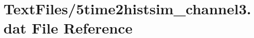 \hypertarget{5time2histsim__channel3_8dat}{}\section{Text\+Files/5time2histsim\+\_\+channel3.dat File Reference}
\label{5time2histsim__channel3_8dat}
